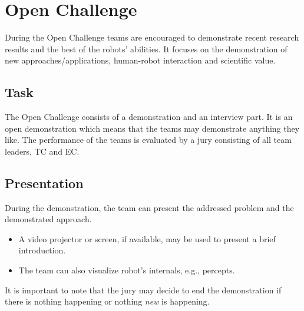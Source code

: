 \newcommand{\bonusRobotCoop}{5~}

\section{Open Challenge}
\label{sec:test_open_challenge}

During the Open Challenge teams are encouraged to demonstrate recent research results and the best of the robots' abilities. It focuses on the demonstration of new approaches/applications, human-robot interaction and scientific value.

\subsection{Task}

The Open Challenge consists of a demonstration and an interview part. 
It is an open demonstration which means that the teams may demonstrate anything they like.  
The performance of the teams is evaluated by a jury consisting of all team leaders, TC and EC.

\subsection{Presentation} 
During the demonstration, the team can present the addressed problem and the demonstrated approach.
\begin{itemize}
\item A video projector or screen, if available, may be used to present a brief introduction.
\item The team can also visualize robot's internals, e.g., percepts. 
\end{itemize}

It is important to note that the jury may decide to end the demonstration if there is nothing happening or nothing \emph{new} is happening.

\OpenDemonstrationChanges

